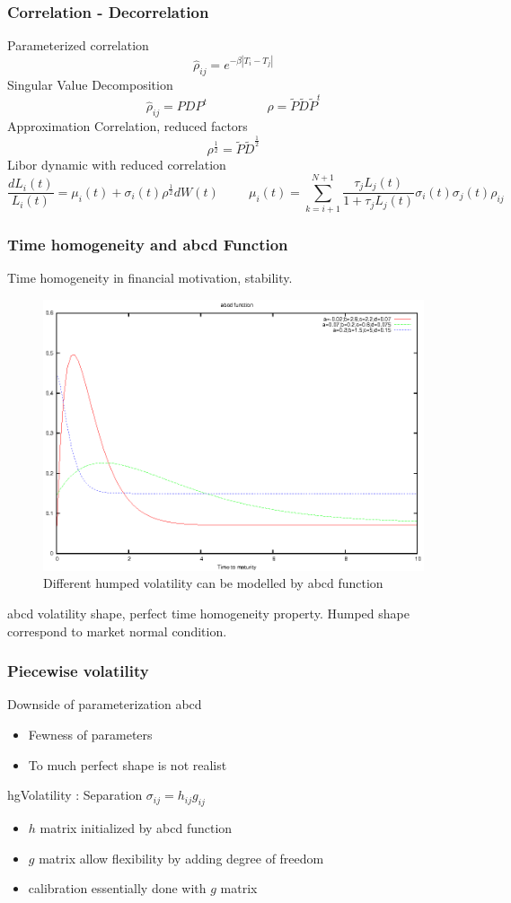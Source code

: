 \documentclass[8pt]{beamer}
\newcommand{\Lit}{L_{i}(t)}
\newcommand{\muit}{\mu_i(t)}
\newcommand{\sigmait}{\sigma_i(t)}
\newcommand{\Ljt}{L_{j}(t)}
\newcommand{\sigmajt}{\sigma_j(t)}
\newcommand{\rhoij}{\rho_{ij}}
\begin{document}
\begin{frame}
\frametitle{Correlation - Decorrelation}
Parameterized correlation
\[
\hat{\rho}_{ij} = e^{- \beta |T_i-T_j|}
\]
Singular Value Decomposition
\[
\hat{\rho}_{ij} = PDP^t \hspace{2cm} \rho = \tilde{P}\tilde{D}\tilde{P}^t
\]
Approximation Correlation, reduced factors
\[
\rho^{\frac{1}{2}} =  \tilde{P}\tilde{D}^{\frac{1}{2}}
\]
Libor dynamic with reduced correlation
\[
\frac{d\Lit}{\Lit} = \muit + \sigmait \rho^{\frac{1}{2} } dW(t)
\hspace{1cm}
\muit = \sum_{k=i+1}^{N+1} \frac{\tau_j \Ljt}{1+\tau_j \Ljt} \sigmait \sigmajt \rhoij
\]
\end{frame}

\begin{frame}
\frametitle{Time homogeneity and abcd Function}
Time homogeneity in financial motivation, stability.
\begin {figure}[h]
\begin{center}
\includegraphics[scale=0.4]{gnuplot_abcdFunction}
\end{center}
\caption{\label{fig:abcd_curve} Different humped volatility can be modelled by  abcd function}
\end {figure}
abcd volatility shape, perfect time homogeneity property. Humped shape correspond to market normal condition.
\end{frame}

\begin{frame}
\frametitle{Piecewise volatility}
Downside of parameterization abcd
\begin{itemize}
\item Fewness of parameters
\item To much perfect shape is not realist
\end{itemize}
hgVolatility : Separation $\sigma_{ij} = h_{ij}g_{ij}$
\begin{itemize}
\item $h$ matrix initialized by abcd function
\item $g$ matrix allow flexibility by adding degree of freedom
\item calibration essentially done with $g$ matrix
\end{itemize} 
\end{frame}
\end{document}
